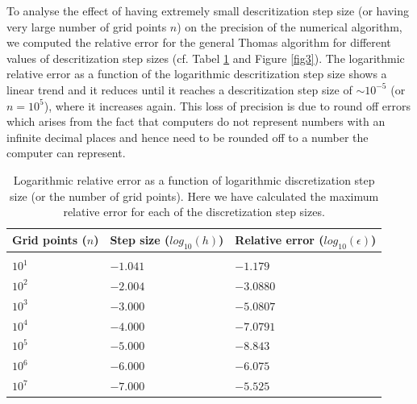 \documentclass[a4paper]{article}
\begin{document}
To analyse the effect of having extremely small descritization step size (or  having very large number of grid points $n$) on the precision of the numerical algorithm, we computed the relative error for the general Thomas algorithm for different values of descritization step sizes (cf. Tabel \ref{RelativErr} and Figure \ref{fig3}). The logarithmic relative error as a function of the logarithmic descritization step size shows a linear trend and it reduces until it reaches a descritization step size of $\sim 10
^{-5}$ (or $n=10^{5}$), where it increases again. This loss of precision is due to round off errors which arises from the fact that computers do not represent numbers with an infinite decimal places and hence need to be rounded off to a number the computer can represent. 

\begin{table}[H]
\begin{center}
  \begin{tabular}{| l | l |l |}
  \hline
    Grid points ($n$) & Step size ($log_{10}(h)$) & Relative error ($log_{10}(\epsilon)$)  \\[0.10cm]\hline \hline
     & \\
     $10^1$ & $-1.041$ & $  -1.179  $ \\[0.10cm]
     $10^2$ & $-2.004$ & $  -3.0880 $ \\[0.10cm]
     $10^3$ & $-3.000$ & $  -5.0807 $ \\[0.10cm]
     $10^4$ & $-4.000$ & $  -7.0791 $ \\[0.10cm]
     $10^5$ & $-5.000$ & $  -8.843  $ \\[0.10cm]
     $10^6$ & $-6.000$ & $  -6.075  $ \\[0.10cm]
     $10^7$ & $-7.000$ & $  -5.525  $ \\[0.1cm]
     \hline
  \end{tabular}
\end{center}
\caption{Logarithmic relative error as a function of logarithmic discretization step size (or the number of grid points). Here we have calculated the maximum relative error for each of the discretization step sizes.}
\label{RelativErr}
\end{table}
\end{document}
